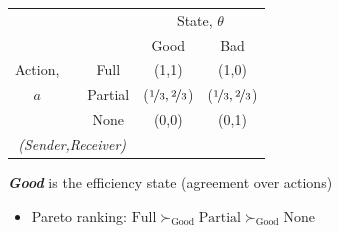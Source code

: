 \documentclass{beamer}
\begin{document}
\begin{frame}
\begin{card}[Payoffs]
	\begin{center}%
		\begin{tabular}{c|cc|c|c|}
		\multicolumn{1}{c}{} &  & \multicolumn{1}{c}{} & \multicolumn{2}{c}{State, $\theta$} \\ 
		\cline{4-5} 
		\multicolumn{1}{c}{} &  & \multicolumn{1}{c}{} & \multicolumn{1}{c}{Good} & \multicolumn{1}{c}{Bad} \\ 
		\cline{4-5} 
		Action, &  & Full & (1,1) & (1,0) \\ 
		\cline{4-5} 
		$a$ &  & Partial & ($\nicefrac{1}{3},\nicefrac{2}{3}$) & ($\nicefrac{1}{3},\nicefrac{2}{3}$) \\ 
		\cline{4-5} 
		 &  & None & (0,0) & (0,1) \\ 
		\cline{4-5} 
		\multicolumn{3}{c}{\emph{(Sender,Receiver)}} & \multicolumn{1}{c}{} & \multicolumn{1}{c}{} \\ 
		\end{tabular}
	\end{center}
\end{card}
\begin{card}
\textbf{\emph{Good}} is the efficiency state (agreement
        over actions)
            \begin{itemize}
                \item Pareto ranking: $\text{Full}\succ_{\text{Good}}\text{Partial}\succ_{\text{Good}}\text{None}$
            \end{itemize}
\end{card}
\end{frame}
\end{document}

